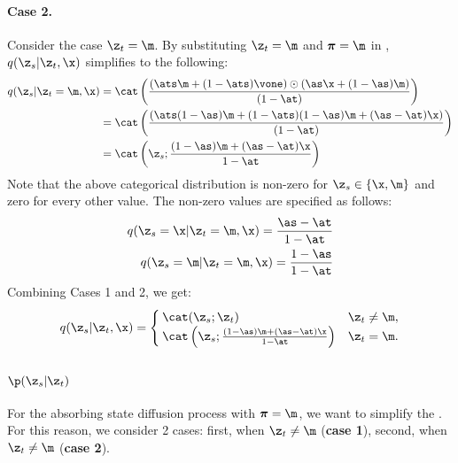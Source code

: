 \documentclass{article} %
\def\prior{\text{$\boldsymbol{\mathit{\pi}}$}}
\begin{document}
{\begin{appendices}
\paragraph{Case 2.}
Consider the case \textbf{$\z_t = \m$}. By substituting $\z_t = \m$ and $\prior = \m$ in , 
$q(\z_s | \z_t, \x)$ simplifies to the following:
\begin{align}\label{supp:eqn:d3pm_posterior_masked}
    q(\z_s | \z_t=\m, \x)
    & = \cat \left(\frac{(\ats \m + (1 - \ats)\vone)  \odot (\as \x + (1 - \as)\m)}{(1 - \at)} \right) \nonumber \\
    & = \cat \left(\frac{(\ats(1 - \as)\m + (1 - \ats)(1 - \as)\m + (\as - \at) \x)}{(1 - \at)} \right) \nonumber \\
    & = \cat \left( \z_s; \frac{
        (1 - \as)\m + (\as - \at)\x}{1 - \at}\right)
\end{align}
Note that the above categorical distribution is non-zero for $\z_s \in \{\x, \m\}$ and zero for every other value. The non-zero values are specified as follows:
\begin{align}
    q(\z_s = \x| \z_t = \m, \x) = \frac{
        \as - \at}{1 - \at}\label{eqn:d3pm_q_st_unmasked_old} \\
    q(\z_s = \m| \z_t = \m, \x) = \frac{1 - \as}{1 - \at} \label{eqn:d3pm_q_st_masked_old}
\end{align}
Combining Cases 1 and 2, we get:
\begin{align}\label{eqn:q_st_discrete}
    q(\z_s | \z_t, \x) =
    \begin{cases}
        \cat (\z_s; \z_t) & \z_t \neq \m, \\
        \cat \left( \z_s; \frac{
        (1 - \as)\m + (\as - \at)\x}{1 - \at}\right) & \z_t=\m. 
    \end{cases}
\end{align}


\subsubsection{\texorpdfstring{$\p(\z_s | \z_t)$}{Lg}}\label{appsubsubsec:simplified_p}
For the absorbing state diffusion process with $\prior = \m$, we want to simplify the . For this reason, we consider 2 cases: first, when $\z_t \neq \m$ (\textbf{case 1}), second, when $\z_t \neq \m$ (\textbf{case 2}).


\end{appendices}}
\end{document}

